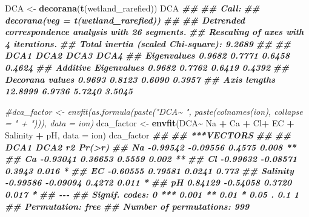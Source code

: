\documentclass[
]{article}
\newenvironment{Shaded}{\begin{snugshade}}{\end{snugshade}}
\newcommand{\AttributeTok}[1]{\textcolor[rgb]{0.13,0.29,0.53}{#1}}
\newcommand{\CommentTok}[1]{\textcolor[rgb]{0.56,0.35,0.01}{\textit{#1}}}
\newcommand{\DocumentationTok}[1]{\textcolor[rgb]{0.56,0.35,0.01}{\textbf{\textit{#1}}}}
\newcommand{\FunctionTok}[1]{\textcolor[rgb]{0.13,0.29,0.53}{\textbf{#1}}}
\newcommand{\NormalTok}[1]{#1}
\newcommand{\OtherTok}[1]{\textcolor[rgb]{0.56,0.35,0.01}{#1}}
\newcommand{\SpecialCharTok}[1]{\textcolor[rgb]{0.81,0.36,0.00}{\textbf{#1}}}
\begin{document}
\begin{Shaded}
\begin{Highlighting}[]
\NormalTok{DCA }\OtherTok{\textless{}{-}} \FunctionTok{decorana}\NormalTok{(}\FunctionTok{t}\NormalTok{(wetland\_rarefied))}
\NormalTok{DCA}
\DocumentationTok{\#\# }
\DocumentationTok{\#\# Call:}
\DocumentationTok{\#\# decorana(veg = t(wetland\_rarefied)) }
\DocumentationTok{\#\# }
\DocumentationTok{\#\# Detrended correspondence analysis with 26 segments.}
\DocumentationTok{\#\# Rescaling of axes with 4 iterations.}
\DocumentationTok{\#\# Total inertia (scaled Chi{-}square): 9.2689 }
\DocumentationTok{\#\# }
\DocumentationTok{\#\#                         DCA1   DCA2   DCA3   DCA4}
\DocumentationTok{\#\# Eigenvalues           0.9682 0.7771 0.6458 0.4624}
\DocumentationTok{\#\# Additive Eigenvalues  0.9682 0.7762 0.6419 0.4392}
\DocumentationTok{\#\# Decorana values       0.9693 0.8123 0.6090 0.3957}
\DocumentationTok{\#\# Axis lengths         12.8999 6.9736 5.7240 3.5045}
\end{Highlighting}
\end{Shaded}

\begin{Shaded}
\begin{Highlighting}[]
\CommentTok{\#dca\_factor \textless{}{-} envfit(as.formula(paste("DCA\textasciitilde{} ", paste(colnames(ion), collapse = " + "))), data = ion)}
\NormalTok{dca\_factor }\OtherTok{\textless{}{-}} \FunctionTok{envfit}\NormalTok{(DCA}\SpecialCharTok{\textasciitilde{}}\NormalTok{ Na }\SpecialCharTok{+}\NormalTok{ Ca }\SpecialCharTok{+}\NormalTok{ Cl}\SpecialCharTok{+}\NormalTok{ EC }\SpecialCharTok{+}\NormalTok{ Salinity }\SpecialCharTok{+}\NormalTok{ pH, }\AttributeTok{data =}\NormalTok{ ion)}
\NormalTok{dca\_factor}
\DocumentationTok{\#\# }
\DocumentationTok{\#\# ***VECTORS}
\DocumentationTok{\#\# }
\DocumentationTok{\#\#              DCA1     DCA2     r2 Pr(\textgreater{}r)   }
\DocumentationTok{\#\# Na       {-}0.99542 {-}0.09556 0.4575  0.008 **}
\DocumentationTok{\#\# Ca       {-}0.93041  0.36653 0.5559  0.002 **}
\DocumentationTok{\#\# Cl       {-}0.99632 {-}0.08571 0.3943  0.016 * }
\DocumentationTok{\#\# EC       {-}0.60555  0.79581 0.0241  0.773   }
\DocumentationTok{\#\# Salinity {-}0.99586 {-}0.09094 0.4272  0.011 * }
\DocumentationTok{\#\# pH        0.84129 {-}0.54058 0.3720  0.017 * }
\DocumentationTok{\#\# {-}{-}{-}}
\DocumentationTok{\#\# Signif. codes:  0 \textquotesingle{}***\textquotesingle{} 0.001 \textquotesingle{}**\textquotesingle{} 0.01 \textquotesingle{}*\textquotesingle{} 0.05 \textquotesingle{}.\textquotesingle{} 0.1 \textquotesingle{} \textquotesingle{} 1}
\DocumentationTok{\#\# Permutation: free}
\DocumentationTok{\#\# Number of permutations: 999}
\end{Highlighting}
\end{Shaded}
\end{document}
